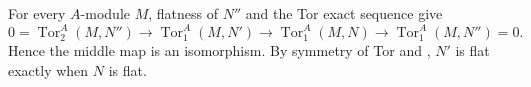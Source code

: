 For every $A$-module $M$, flatness of $N''$ and the Tor exact sequence give
\[0=\operatorname{Tor}_2^A(M,N'')\to\operatorname{Tor}_1^A(M,N')\to\operatorname{Tor}_1^A(M,N)\to\operatorname{Tor}_1^A(M,N'')=0.\]
Hence the middle map is an isomorphism. By symmetry of Tor and , $N'$ is flat exactly when $N$ is flat.
